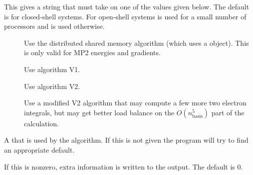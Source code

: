 \begin{description}
\begin{description}
     \end{description}

  \item[\keywd{algorithm}] This gives a string that must take on one of the
     values given below.  The default is  for closed-shell
     systems.  For open-shell systems  is used for a small number
     of processors and  is used otherwise.

     \begin{description}

        \item[] Use the distributed shared memory algorithm
          (which uses a  object).  This is only valid
          for MP2 energies and gradients.

        \item[] Use algorithm V1.

        \item[] Use algorithm V2.

        \item[] Use a modified V2 algorithm that may compute a
           few more two electron integrals, but may get better load balance
           on the $O(n_\mathrm{basis}^5)$ part of the calculation.

     \end{description}

  \item[\keywd{memorygrp}] A 
      that is used by the 
     algorithm.  If this is not given the program will try to find an
     appropriate default.

  \item[\keywd{debug}] If this is nonzero, extra information is written to
     the output.  The default is 0.

\end{description}

